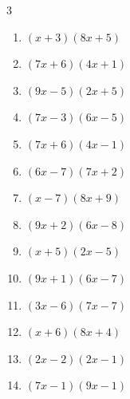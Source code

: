 \begin{multicols}{3}
\begin{enumerate}

  \item $(x+3)(8x+5)$


\columnbreak %

  \item $(7x+6)(4x+1)$


  \item $(9x-5)(2x+5)$


  \item $(7x-3)(6x-5)$


  \item $(7x+6)(4x-1)$


  \item $(6x-7)(7x+2)$


  \item $(x-7)(8x+9)$


  \item $(9x+2)(6x-8)$


  \item $(x+5)(2x-5)$


  \item $(9x+1)(6x-7)$


  \item $(3x-6)(7x-7)$


  \item $(x+6)(8x+4)$


  \item $(2x-2)(2x-1)$


  \item $(7x-1)(9x-1)$



\end{enumerate}
\end{multicols}

